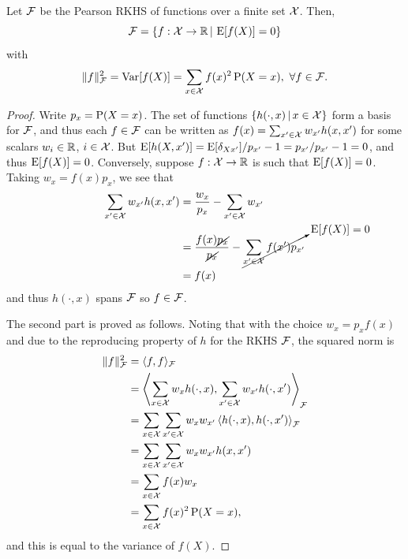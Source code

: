\begin{proposition}
  Let ${\mathcal F}$ be the Pearson RKHS of functions over a finite set ${\mathcal X}$.
  Then,
  \[
    {\mathcal F} = \{f:{\mathcal X}\to\mathbb{R} \,|\, \operatorname{E} [f(X)] = 0 \}
  \]
  with
  \[
    \lVert f\rVert_{\mathcal F}^2 = \operatorname{Var} [f(X)] = \sum_{x\in{\mathcal X}} f(x)^2 \operatorname{P}(X=x) , \ \forall f \in {\mathcal F}.
  \]
\end{proposition}

\begin{proof}
  Write $p_x = \operatorname{P}(X=x)$.
  The set of functions $\{h(\cdot,x) \,|\, x \in {\mathcal X}\}$ form a basis for ${\mathcal F}$, and thus each $f \in {\mathcal F}$ can be written as $f(x) = \sum_{x'\in{\mathcal X}} w_{x'}h(x,x')$ for some scalars $w_i\in\mathbb{R}$, $i\in{\mathcal X}$.
  But $\operatorname{E}[ h(X,x')] = \operatorname{E} [\delta_{Xx'}] / p_{x'} - 1 = p_{x'} / p_{x'} - 1 = 0$, and thus $\operatorname{E} [f(X)] = 0$.
  Conversely, suppose $f:{\mathcal X}\to\mathbb{R}$ is such that $\operatorname{E} [f(X)] = 0$.
  Taking $w_x = f(x)p_x$, we see that
  \begin{align*}
    \sum_{x'\in{\mathcal X}} w_{x'}h(x,x') 
    &= \frac{w_x}{p_x} - \sum_{x'\in{\mathcal X}} w_{x'} \\
    &= \frac{f(x)\cancel{p_x}}{\cancel{p_x}} - \cancelto{\operatorname{E} [f(X)] = 0}{\sum_{x'\in{\mathcal X}} f(x') p_{x'}} \\
    &= f(x)
  \end{align*}
  and thus $h(\cdot,x)$ spans ${\mathcal F}$ so $f\in{\mathcal F}$.
  
  The second part is proved as follows.
  Noting that with the choice $w_x = p_xf(x)$ and due to the reproducing property of $h$ for the RKHS ${\mathcal F}$, the squared norm is 
  \begin{align*}
    \lVert f\rVert_{\mathcal F}^2 
    &= \langle f,f\rangle_{\mathcal F} \\
    &= \left\langle \sum_{x\in{\mathcal X}} w_{x}h(\cdot,x), \sum_{x'\in{\mathcal X}} w_{x'}h(\cdot,x') \right\rangle_{\mathcal F} \\
    &= \sum_{x\in{\mathcal X}} \sum_{x'\in{\mathcal X}} w_{x} w_{x'} \left\langle h(\cdot,x), h(\cdot,x') \right\rangle_{\mathcal F} \\
    &= \sum_{x\in{\mathcal X}} \sum_{x'\in{\mathcal X}} w_{x} w_{x'} h(x,x')  \\
    &= \sum_{x\in{\mathcal X}} f(x) w_{x}  \\
    &= \sum_{x\in{\mathcal X}} f(x)^2 \operatorname{P}(X=x),
  \end{align*}
  and this is equal to the variance of $f(X)$.
  \vspace{-0.5em}
\end{proof}

